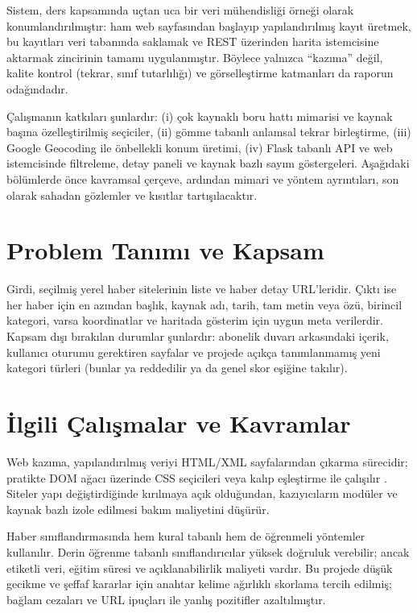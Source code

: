 \documentclass[conference,a4paper]{IEEEtran}
\begin{document}
Sistem, ders kapsamında uçtan uca bir veri mühendisliği örneği olarak konumlandırılmıştır: ham web sayfasından başlayıp yapılandırılmış kayıt üretmek, bu kayıtları veri tabanında saklamak ve REST üzerinden harita istemcisine aktarmak zincirinin tamamı uygulanmıştır. Böylece yalnızca ``kazıma'' değil, kalite kontrol (tekrar, sınıf tutarlılığı) ve görselleştirme katmanları da raporun odağındadır.

Çalışmanın katkıları şunlardır: (i) çok kaynaklı boru hattı mimarisi ve kaynak başına özelleştirilmiş seçiciler, (ii) gömme tabanlı anlamsal tekrar birleştirme, (iii) Google Geocoding ile önbellekli konum üretimi, (iv) Flask tabanlı API ve web istemcisinde filtreleme, detay paneli ve kaynak bazlı sayım göstergeleri. Aşağıdaki bölümlerde önce kavramsal çerçeve, ardından mimari ve yöntem ayrıntıları, son olarak sahadan gözlemler ve kısıtlar tartışılacaktır.

\section{Problem Tanımı ve Kapsam}
Girdi, seçilmiş yerel haber sitelerinin liste ve haber detay URL'leridir. Çıktı ise her haber için en azından başlık, kaynak adı, tarih, tam metin veya özü, birincil kategori, varsa koordinatlar ve haritada gösterim için uygun meta verilerdir. Kapsam dışı bırakılan durumlar şunlardır: abonelik duvarı arkasındaki içerik, kullanıcı oturumu gerektiren sayfalar ve projede açıkça tanımlanmamış yeni kategori türleri (bunlar ya reddedilir ya da genel skor eşiğine takılır).

\section{İlgili Çalışmalar ve Kavramlar}
Web kazıma, yapılandırılmış veriyi HTML/XML sayfalarından çıkarma sürecidir; pratikte DOM ağacı üzerinde CSS seçicileri veya kalıp eşleştirme ile çalışılır \cite{scraping}. Siteler yapı değiştirdiğinde kırılmaya açık olduğundan, kazıyıcıların modüler ve kaynak bazlı izole edilmesi bakım maliyetini düşürür.

Haber sınıflandırmasında hem kural tabanlı hem de öğrenmeli yöntemler kullanılır. Derin öğrenme tabanlı sınıflandırıcılar yüksek doğruluk verebilir; ancak etiketli veri, eğitim süresi ve açıklanabilirlik maliyeti vardır. Bu projede düşük gecikme ve şeffaf kararlar için anahtar kelime ağırlıklı skorlama tercih edilmiş; bağlam cezaları ve URL ipuçları ile yanlış pozitifler azaltılmıştır.
\end{document}
